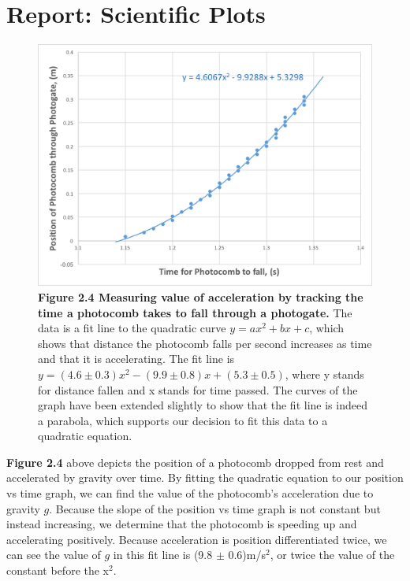 \documentclass[11pt]{report}
\begin{document}
\section*{Report: Scientific Plots}
\begin{figure}[h!]
    \includegraphics[width=\linewidth]{Photocomb2.png}
    \captionsetup{labelformat=empty}
    \caption{\textbf{Figure 2.4  Measuring value of acceleration by tracking the
    time a photocomb takes to fall through a photogate.}  The data is a fit line
    to the quadratic curve \(y = ax^2 + bx + c\), which shows that distance the 
    photocomb falls per second increases as time and that it is accelerating.  
    The fit line is \(y = (4.6 \pm 0.3)x^2 - (9.9 \pm 0.8)x + (5.3 \pm 0.5)\), 
    where y stands for distance fallen and x stands for time passed. The curves
of the graph have been extended slightly to show that the fit line is indeed a
parabola, which supports our decision to fit this data to a quadratic equation.}
\end{figure}

\textbf{Figure 2.4} above depicts the position of a photocomb dropped from
rest and accelerated by gravity over time.  By fitting the quadratic equation 
to our position vs time graph, we can find the value of the photocomb's 
acceleration due to gravity \(g\). Because the slope of the position vs time
graph is not constant but instead increasing, we determine that the photocomb is
speeding up and accelerating positively.  Because acceleration is position 
differentiated twice, we can see the value of \(g\) in this fit line is 
(9.8 $\pm$ 0.6)m/s$^2$, or twice the value of the constant before the x$^2$.  
\end{document}
